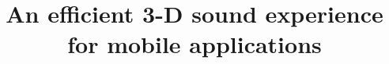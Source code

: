 \documentclass[journal]{IEEEtran}
\begin{document}
%
\title{An efficient 3-D sound experience for mobile applications}


\author{
}



% 


\end{document}
